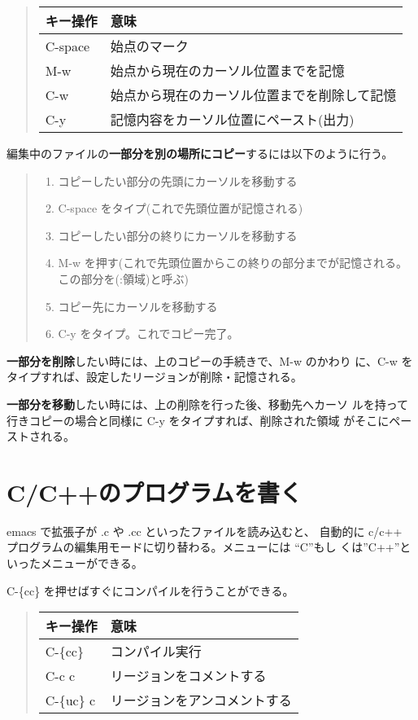 \documentclass{jreport}
\begin{document}
\begin{quote}
\begin{tabular}[t]{ll}\hline
キー操作 & 意味 \\ \hline
C-space & 始点のマーク \\
M-w & 始点から現在のカーソル位置までを記憶\\
C-w & 始点から現在のカーソル位置までを削除して記憶\\
C-y & 記憶内容をカーソル位置にペースト(出力) \\
\hline
\end{tabular}
\end{quote}

編集中のファイルの\textbf{一部分を別の場所にコピー}するには以下のように行う。

\begin{quote}
\begin{enumerate}
\item コピーしたい部分の先頭にカーソルを移動する
\item C-space をタイプ(これで先頭位置が記憶される)
\item コピーしたい部分の終りにカーソルを移動する
\item M-w を押す(これで先頭位置からこの終りの部分までが記憶される。
  この部分を(:領域)と呼ぶ)
\item コピー先にカーソルを移動する
\item C-y をタイプ。これでコピー完了。
\end{enumerate}
\end{quote}

\textbf{一部分を削除}したい時には、上のコピーの手続きで、M-w のかわり
に、C-w をタイプすれば、設定したリージョンが削除・記憶される。

\textbf{一部分を移動}したい時には、上の削除を行った後、移動先へカーソ
ルを持って行きコピーの場合と同様に C-y をタイプすれば、削除された領域
がそこにペーストされる。

\section{C/C++のプログラムを書く}

emacs で拡張子が .c や .cc といったファイルを読み込むと、
自動的に c/c++ プログラムの編集用モードに切り替わる。メニューには ``C''もし
くは''C++''といったメニューができる。

C-\{cc\} を押せばすぐにコンパイルを行うことができる。

\begin{quote}
\begin{tabular}[t]{ll}\hline
キー操作 & 意味 \\ \hline
C-\{cc\} & コンパイル実行 \\
C-c c & リージョンをコメントする\\
C-\{uc\} c & リージョンをアンコメントする\\
\hline
\end{tabular}
\end{quote}
\end{document}
